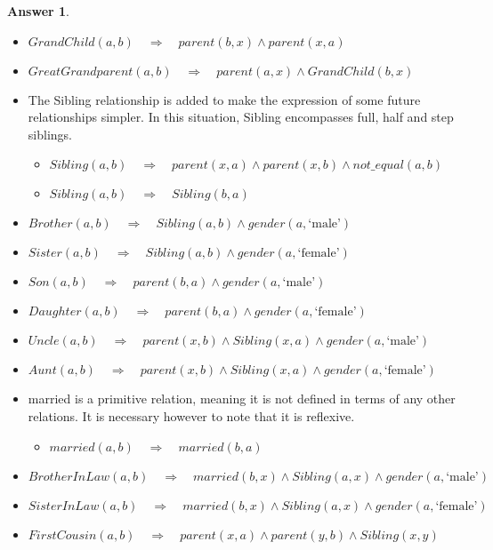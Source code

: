 \documentclass[a4paper]{article}
\renewcommand{\(}{\left(}
\renewcommand{\)}{\right)}
\theoremstyle{plain}
\theoremstyle{plain}
\theoremstyle{definition}
\newtheorem*{answer}{Answer}
\begin{document}
\begin{shaded}
\begin{answer}
$$ $$
\begin{itemize}
  \item $ GrandChild(a,b) \quad \Rightarrow \quad parent(b,x) \wedge parent(x,a) $
  \item $ GreatGrandparent(a,b) \quad \Rightarrow \quad parent(a,x) \wedge GrandChild(b,x) $
  \item The Sibling relationship is added to make the expression of some future relationships simpler. In this situation, Sibling encompasses full, half and step siblings.
      \begin{itemize}
        \item $ Sibling(a,b) \quad \Rightarrow \quad  parent(x,a) \wedge parent(x,b) \wedge not\_equal(a,b) $
        \item $ Sibling(a,b) \quad \Rightarrow \quad Sibling(b,a) $
      \end{itemize}
  \item $Brother(a,b) \quad \Rightarrow \quad Sibling(a,b) \wedge gender(a,\text{`male'})$
  \item $Sister(a,b) \quad \Rightarrow \quad Sibling(a,b) \wedge gender(a,\text{`female'})$
  \item $Son(a,b) \quad \Rightarrow \quad parent(b,a) \wedge gender(a,\text{`male'})$
  \item $ Daughter(a,b) \quad \Rightarrow \quad parent(b,a) \wedge gender(a,\text{`female'})$
  \item $ Uncle(a,b) \quad \Rightarrow \quad parent(x,b) \wedge Sibling(x,a) \wedge gender(a,\text{`male'}) $
  \item $ Aunt(a,b) \quad \Rightarrow \quad parent(x,b) \wedge Sibling(x,a) \wedge gender(a,\text{`female'}) $
  \item married is a primitive relation, meaning it is not defined in terms of any other relations. It is necessary however to note that it is reflexive.
      \begin{itemize}
        \item $married(a,b) \quad \Rightarrow \quad married(b,a)$
      \end{itemize}
  \item $ BrotherInLaw(a,b) \quad \Rightarrow \quad married(b,x) \wedge Sibling(a,x) \wedge gender(a,\text{`male'}) $
  \item $ SisterInLaw(a,b) \quad \Rightarrow \quad married(b,x) \wedge Sibling(a,x) \wedge gender(a,\text{`female'}) $
  \item $ FirstCousin(a,b) \quad \Rightarrow \quad parent(x,a) \wedge parent(y,b) \wedge Sibling(x,y) $
\end{itemize}
\end{answer}
\end{shaded}
\end{document}
